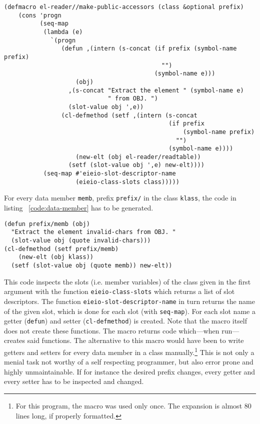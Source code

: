 \documentclass[a4paper,10pt,twoside]{report}
\newcommand{\sym}[1]{\texttt{#1}}
\newcommand{\fun}[1]{\texttt{#1}}
\begin{document}
\begin{lstlisting}[style=lispcode,caption={Create accessors for all data members
  of a given class.},label={code:make-accessors}]
(defmacro el-reader//make-public-accessors (class &optional prefix)
    (cons 'progn
          (seq-map
           (lambda (e)
             `(progn
                (defun ,(intern (s-concat (if prefix (symbol-name prefix)
                                            "")
                                          (symbol-name e)))
                    (obj)
                  ,(s-concat "Extract the element " (symbol-name e)
                             " from OBJ. ")
                  (slot-value obj ',e))
                (cl-defmethod (setf ,(intern (s-concat
                                              (if prefix
                                                  (symbol-name prefix)
                                                "")
                                              (symbol-name e))))
                    (new-elt (obj el-reader/readtable))
                  (setf (slot-value obj ',e) new-elt))))
           (seq-map #'eieio-slot-descriptor-name
                    (eieio-class-slots class)))))
\end{lstlisting}

For every data member \sym{memb}, prefix \sym{prefix/} in the class \sym{klass},
the code in listing ~\ref{code:data-member} has to be generated.

\begin{lstlisting}[style=lispcode,caption={Getter and Setter for a member called
  \sym{member}.},label={code:data-member}]
(defun prefix/memb (obj)
  "Extract the element invalid-chars from OBJ. "
  (slot-value obj (quote invalid-chars)))
(cl-defmethod (setf prefix/memb)
    (new-elt (obj klass))
  (setf (slot-value obj (quote memb)) new-elt))
\end{lstlisting}

This code inspects the slots (i.e. member variables) of the class given in the
first argument with the function \fun{eieio-class-slots} which returns a list of
slot descriptors.  The function \fun{eieio-slot-descriptor-name} in turn returns
the name of the given slot, which is done for each slot (with \fun{seq-map}).
For each slot name a getter (\fun{defun}) and setter (\fun{cl-defmethod}) is
created.  Note that the macro itself does not create these functions.  The macro
returns code which---when run---creates said functions.  The alternative to this
macro would have been to write getters and setters for every data member in a
class manually.\footnote{For this program, the macro was used only once.  The
  expansion is almost 80 lines long, if properly formatted.}  This is not only a
menial task not worthy of a self respecting programmer, but also error prone and
highly unmaintainable.  If for instance the desired prefix changes, every getter
and every setter has to be inspected and changed.
\end{document}
